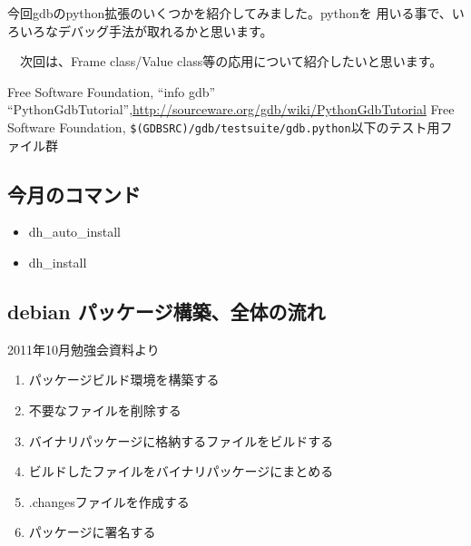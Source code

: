 \documentclass[mingoth,a4paper]{jsarticle}
\begin{document}
 今回gdbのpython拡張のいくつかを紹介してみました。pythonを
用いる事で、いろいろなデバッグ手法が取れるかと思います。

　次回は、Frame class/Value class等の応用について紹介したいと思います。

\begin{thebibliography}{98}
 Free Software Foundation, ``info gdb''
 ``PythonGdbTutorial'',\url{http://sourceware.org/gdb/wiki/PythonGdbTutorial}
 Free Software Foundation, \verb!$(GDBSRC)/gdb/testsuite/gdb.python!以下のテスト用ファイル群
\end{thebibliography}


\subsection{今月のコマンド}
{\Large
\begin{itemize}
\item dh\_auto\_install
\item dh\_install
\end{itemize}
}

\subsection{debian パッケージ構築、全体の流れ}
2011年10月勉強会資料より
\begin{enumerate}
\item パッケージビルド環境を構築する
\item 不要なファイルを削除する
\item バイナリパッケージに格納するファイルをビルドする
\item ビルドしたファイルをバイナリパッケージにまとめる
\item .changesファイルを作成する
\item パッケージに署名する
\end{enumerate}
\end{document}
